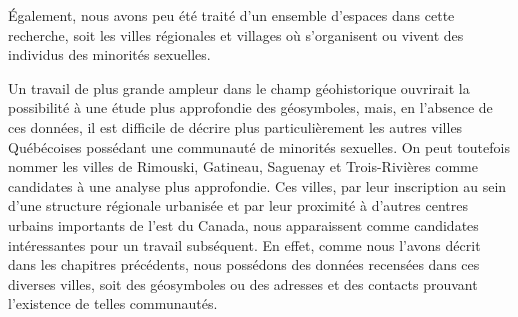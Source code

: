 Également, nous avons peu été traité d'un ensemble d'espaces dans cette recherche, soit les villes régionales et villages où s'organisent ou vivent des individus des minorités sexuelles.


Un travail de plus grande ampleur dans le champ géohistorique ouvrirait la possibilité à une étude plus approfondie des géosymboles, mais, en l'absence de ces données, il est difficile de décrire plus particulièrement les autres villes Québécoises possédant une communauté de minorités sexuelles.
On peut toutefois nommer les villes de Rimouski, Gatineau, Saguenay et Trois-Rivières comme candidates à une analyse plus approfondie.
Ces villes, par leur inscription au sein d'une structure régionale urbanisée et par leur proximité à d'autres centres urbains importants de l'est du Canada, nous apparaissent comme candidates intéressantes pour un travail subséquent.
En effet, comme nous l'avons décrit dans les chapitres précédents, nous possédons des données recensées dans ces diverses villes, soit des géosymboles ou des adresses et des contacts prouvant l'existence de telles communautés.

